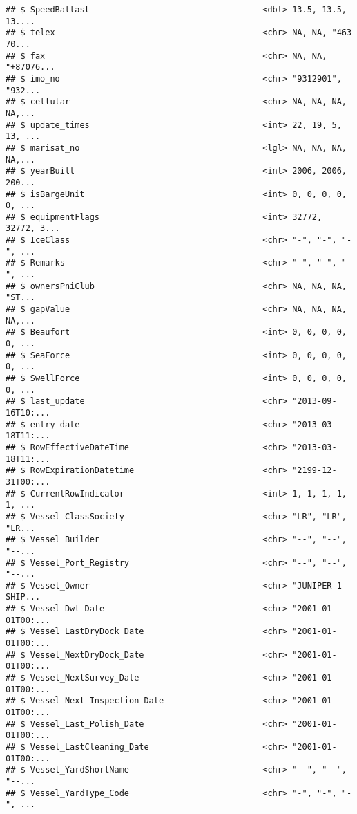 \documentclass[]{article}
\begin{document}
\begin{verbatim}
## $ SpeedBallast                                   <dbl> 13.5, 13.5, 13....
## $ telex                                          <chr> NA, NA, "463 70...
## $ fax                                            <chr> NA, NA, "+87076...
## $ imo_no                                         <chr> "9312901", "932...
## $ cellular                                       <chr> NA, NA, NA, NA,...
## $ update_times                                   <int> 22, 19, 5, 13, ...
## $ marisat_no                                     <lgl> NA, NA, NA, NA,...
## $ yearBuilt                                      <int> 2006, 2006, 200...
## $ isBargeUnit                                    <int> 0, 0, 0, 0, 0, ...
## $ equipmentFlags                                 <int> 32772, 32772, 3...
## $ IceClass                                       <chr> "-", "-", "-", ...
## $ Remarks                                        <chr> "-", "-", "-", ...
## $ ownersPniClub                                  <chr> NA, NA, NA, "ST...
## $ gapValue                                       <chr> NA, NA, NA, NA,...
## $ Beaufort                                       <int> 0, 0, 0, 0, 0, ...
## $ SeaForce                                       <int> 0, 0, 0, 0, 0, ...
## $ SwellForce                                     <int> 0, 0, 0, 0, 0, ...
## $ last_update                                    <chr> "2013-09-16T10:...
## $ entry_date                                     <chr> "2013-03-18T11:...
## $ RowEffectiveDateTime                           <chr> "2013-03-18T11:...
## $ RowExpirationDatetime                          <chr> "2199-12-31T00:...
## $ CurrentRowIndicator                            <int> 1, 1, 1, 1, 1, ...
## $ Vessel_ClassSociety                            <chr> "LR", "LR", "LR...
## $ Vessel_Builder                                 <chr> "--", "--", "--...
## $ Vessel_Port_Registry                           <chr> "--", "--", "--...
## $ Vessel_Owner                                   <chr> "JUNIPER 1 SHIP...
## $ Vessel_Dwt_Date                                <chr> "2001-01-01T00:...
## $ Vessel_LastDryDock_Date                        <chr> "2001-01-01T00:...
## $ Vessel_NextDryDock_Date                        <chr> "2001-01-01T00:...
## $ Vessel_NextSurvey_Date                         <chr> "2001-01-01T00:...
## $ Vessel_Next_Inspection_Date                    <chr> "2001-01-01T00:...
## $ Vessel_Last_Polish_Date                        <chr> "2001-01-01T00:...
## $ Vessel_LastCleaning_Date                       <chr> "2001-01-01T00:...
## $ Vessel_YardShortName                           <chr> "--", "--", "--...
## $ Vessel_YardType_Code                           <chr> "-", "-", "-", ...
\end{verbatim}
\end{document}
